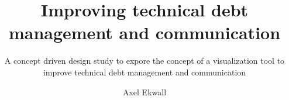 \documentclass[sigchi, nonacm, balance=false, authorversion=true]{acmart}
\begin{document}
\title{Improving technical debt management and communication}
\subtitle{A concept driven design study to expore the concept of a visualization tool to improve technical debt management and communication}
\author{Axel Ekwall}




\maketitle














\appendix
\end{document}
